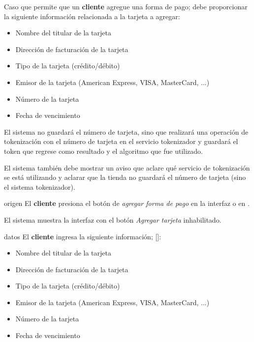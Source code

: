 %
%

{
  Caso que permite que un \textbf{cliente} agregue una forma de pago; debe
  proporcionar la siguiente información relacionada a la tarjeta a agregar:
  \begin{itemize}
    \item Nombre del titular de la tarjeta
    \item Dirección de facturación de la tarjeta
    \item Tipo de la tarjeta (crédito/débito)
    \item Emisor de la tarjeta (American Express, VISA, MasterCard, ...)
    \item Número de la tarjeta
    \item Fecha de vencimiento
  \end{itemize}
  El sistema no guardará el número de tarjeta, sino que realizará una
  operación de tokenización con el número de tarjeta en el servicio tokenizador
  y guardará el token que regrese como resultado y el algoritmo que fue
  utilizado.

  El sistema también debe mostrar un aviso que aclare qué servicio de
  tokenización se está utilizando y aclarar que la tienda no guardará el
  número de tarjeta (sino el sistema tokenizador).

  \begin{trayectoriaPrincipal}

    \item[origen] El \textbf{cliente} presiona el botón de
      \textit{agregar forma de pago} en la interfaz
       o en
      .

    \item El sistema muestra la interfaz
       con el botón
      \textit{Agregar tarjeta} inhabilitado.

    \item[datos] El \textbf{cliente} ingresa la siguiente información;
      []:
      \begin{itemize}
        \item Nombre del titular de la tarjeta
        \item Dirección de facturación de la tarjeta
        \item Tipo de la tarjeta (crédito/débito)
        \item Emisor de la tarjeta (American Express, VISA, MasterCard, ...)
        \item Número de la tarjeta
        \item Fecha de vencimiento
      \end{itemize}


\end{trayectoriaPrincipal}}
